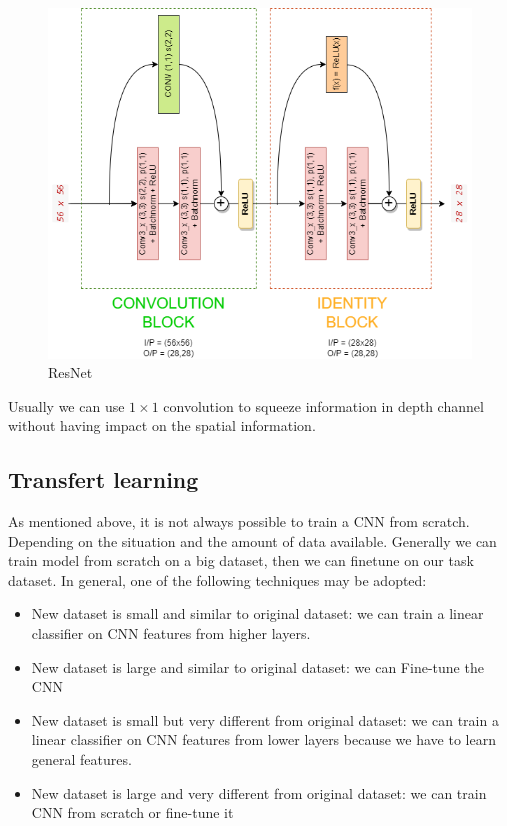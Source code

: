 \begin{itemize}
\begin{figure}[!ht]
            \includegraphics[width=0.5\linewidth]{img/CNN/ResNet.png}
            \caption{ResNet}
            \label{fig:enter-label}
        \end{figure}
\end{itemize}
\begin{note}
    Usually we can use $1 \times 1$ convolution to squeeze information in depth channel without 
    having impact on the spatial information.
\end{note}

\subsection{Transfert learning}
As mentioned above, it is not always possible to train a CNN from scratch. Depending on 
the situation and the amount of data available. Generally we can train model from
scratch on a big dataset, then we can finetune on our task dataset.
In general, one of the following techniques may be adopted:
\begin{itemize}
    \item New dataset is small and similar to original dataset: we can train a linear classifier 
        on CNN features from higher layers.
    \item New dataset is large and similar to original dataset: we can Fine-tune the CNN
    \item New dataset is small but very different from original dataset: we can train a linear 
        classifier on CNN features from lower layers because we have to learn general 
        features.
    \item New dataset is large and very different from original dataset: we can train CNN from 
        scratch or fine-tune it
\end{itemize}